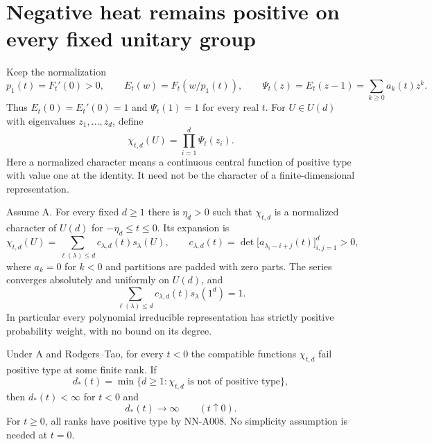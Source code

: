 \section{Negative heat remains positive on every fixed unitary group}
\label{sec:analytic-finite-rank-characters}

Keep the normalization
\[
 p_1(t)=F_t'(0)>0,\qquad
 E_t(w)=F_t(w/p_1(t)),\qquad
 \Psi_t(z)=E_t(z-1)=\sum_{k\ge0}a_k(t)z^k.
\]
Thus $E_t(0)=E_t'(0)=1$ and $\Psi_t(1)=1$ for every real $t$.
For $U\in U(d)$ with eigenvalues $z_1,\ldots,z_d$, define
\[
             \chi_{t,d}(U)=\prod_{i=1}^d\Psi_t(z_i).
\]
Here a normalized character means a continuous central function of
positive type with value one at the identity. It need not be the
character of a finite-dimensional representation.

\begin{theorem}
Assume A. For every fixed $d\ge1$ there is $\eta_d>0$ such that
$\chi_{t,d}$ is a normalized character of $U(d)$ for
$-\eta_d\le t\le0$. Its expansion is
\begin{equation}\label{eq:analytic-fixed-unitary-expansion}
 \chi_{t,d}(U)=
 \sum_{\ell(\lambda)\le d}c_{\lambda,d}(t)s_\lambda(U),
 \qquad
 c_{\lambda,d}(t)=
       \det\bigl[a_{\lambda_i-i+j}(t)\bigr]_{i,j=1}^d>0,
\end{equation}
where $a_k=0$ for $k<0$ and partitions are padded with zero parts.
The series converges absolutely and uniformly on $U(d)$, and
\[
       \sum_{\ell(\lambda)\le d}
          c_{\lambda,d}(t)s_\lambda(1^d)=1.
\]
In particular every polynomial irreducible representation has
strictly positive probability weight, with no bound on its degree.

Under A and Rodgers--Tao, for every $t<0$ the compatible functions
$\chi_{t,d}$ fail positive type at some finite rank. If
\[
 d_*(t)=\min\{d\ge1:\chi_{t,d}\text{ is not of positive type}\},
\]
then $d_*(t)<\infty$ for $t<0$ and
\[
                         d_*(t)\longrightarrow\infty
                                  \qquad(t\uparrow0).
\]
For $t\ge0$, all ranks have positive type by NN-A008. No
simplicity assumption is needed at $t=0$.
\end{theorem}

